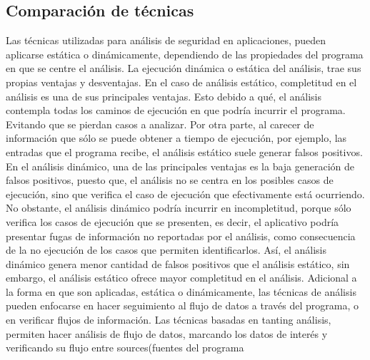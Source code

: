 \subsection{Comparación de técnicas}
Las técnicas utilizadas para análisis de seguridad en aplicaciones, pueden
aplicarse estática o dinámicamente, dependiendo de las propiedades del programa
en que se centre el análisis.\newline
La ejecución dinámica o estática del análisis, trae sus propias ventajas y
desventajas. En el caso de análisis estático, completitud en el análisis es una
de sus principales ventajas. Esto debido a qué, el análisis contempla todas los
caminos de ejecución en que podría incurrir el programa. Evitando que se pierdan
casos a analizar. Por otra parte, al carecer de información que sólo se puede
obtener a tiempo de ejecución, por ejemplo, las entradas que el programa
recibe, el análisis estático suele generar falsos positivos.\newline
En el análisis dinámico, una de las principales ventajas es la baja generación
de falsos positivos, puesto que, el análisis no se centra en los posibles casos
de ejecución, sino que verifica el caso de ejecución que efectivamente está
ocurriendo. No obstante, el análisis dinámico podría incurrir en incompletitud,
porque sólo verifica los casos de ejecución que se presenten, es decir, el
aplicativo podría presentar fugas de información no reportadas por el análisis,
como consecuencia de la no ejecución de los casos que permiten identificarlos.\newline 
Así, el análisis dinámico genera menor cantidad de falsos positivos que el
análisis estático, sin embargo, el análisis estático ofrece mayor completitud en
el análisis.\newline
Adicional a la forma en que son aplicadas, estática o dinámicamente, las
técnicas de análisis pueden enfocarse en hacer seguimiento al flujo de datos a
través del programa, o en verificar flujos de información. Las técnicas basadas
en tanting análisis, permiten hacer análisis de flujo de datos, marcando los
datos de interés y verificando su flujo entre sources(fuentes del programa
